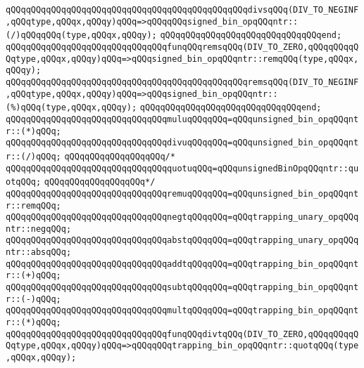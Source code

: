 \verb|qQQqqQQqqQQqqQQqqQQqqQQqqQQqqQQqqQQqqQQqqQQqqQQqdivsqQQq(DIV_TO_NEGINF,qQQqtype,qQQqx,qQQqy)qQQq=>qQQqqQQqsigned_bin_opqQQqntr::(/)qQQqqQQq(type,qQQqx,qQQqy);|\newline
\verb|qQQqqQQqqQQqqQQqqQQqqQQqqQQqqQQqend;|\newline
\newline
\verb|qQQqqQQqqQQqqQQqqQQqqQQqqQQqqQQqfunqQQqremsqQQq(DIV_TO_ZERO,qQQqqQQqqQQqtype,qQQqx,qQQqy)qQQq=>qQQqsigned_bin_opqQQqntr::remqQQq(type,qQQqx,qQQqy);|\newline
\verb|qQQqqQQqqQQqqQQqqQQqqQQqqQQqqQQqqQQqqQQqqQQqqQQqremsqQQq(DIV_TO_NEGINF,qQQqtype,qQQqx,qQQqy)qQQq=>qQQqsigned_bin_opqQQqntr::(%)qQQq(type,qQQqx,qQQqy);|\newline
\verb|qQQqqQQqqQQqqQQqqQQqqQQqqQQqqQQqend;|\newline
\newline
\verb|qQQqqQQqqQQqqQQqqQQqqQQqqQQqqQQqmuluqQQqqQQq=qQQqunsigned_bin_opqQQqntr::(*)qQQq;|\newline
\verb|qQQqqQQqqQQqqQQqqQQqqQQqqQQqqQQqdivuqQQqqQQq=qQQqunsigned_bin_opqQQqntr::(/)qQQq;|\newline
\verb|qQQqqQQqqQQqqQQqqQQq/*|\newline
\verb|qQQqqQQqqQQqqQQqqQQqqQQqqQQqqQQqquotuqQQq=qQQqunsignedBinOpqQQqntr::quotqQQq;|\newline
\verb|qQQqqQQqqQQqqQQqqQQq*/|\newline
\verb|qQQqqQQqqQQqqQQqqQQqqQQqqQQqqQQqremuqQQqqQQq=qQQqunsigned_bin_opqQQqntr::remqQQq;|\newline
\newline
\verb|qQQqqQQqqQQqqQQqqQQqqQQqqQQqqQQqnegtqQQqqQQq=qQQqtrapping_unary_opqQQqntr::negqQQq;|\newline
\verb|qQQqqQQqqQQqqQQqqQQqqQQqqQQqqQQqabstqQQqqQQq=qQQqtrapping_unary_opqQQqntr::absqQQq;|\newline
\verb|qQQqqQQqqQQqqQQqqQQqqQQqqQQqqQQqaddtqQQqqQQq=qQQqtrapping_bin_opqQQqntr::(+)qQQq;|\newline
\verb|qQQqqQQqqQQqqQQqqQQqqQQqqQQqqQQqsubtqQQqqQQq=qQQqtrapping_bin_opqQQqntr::(-)qQQq;|\newline
\verb|qQQqqQQqqQQqqQQqqQQqqQQqqQQqqQQqmultqQQqqQQq=qQQqtrapping_bin_opqQQqntr::(*)qQQq;|\newline
\newline
\verb|qQQqqQQqqQQqqQQqqQQqqQQqqQQqqQQqfunqQQqdivtqQQq(DIV_TO_ZERO,qQQqqQQqqQQqtype,qQQqx,qQQqy)qQQq=>qQQqqQQqtrapping_bin_opqQQqntr::quotqQQq(type,qQQqx,qQQqy);|\newline
